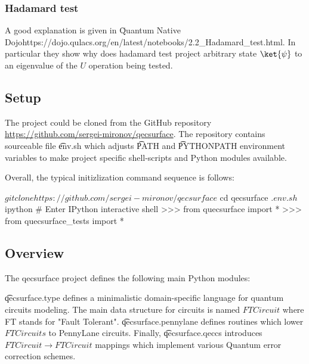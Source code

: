 \subsubsection*{Hadamard test}

A good explanation is given in
\u{Quantum Native Dojo}{https://dojo.qulacs.org/en/latest/notebooks/2.2_Hadamard_test.html}.
In particular they show why does hadamard test project arbitrary state $\ket{\psi}$ to an eigenvalue
of the $U$ operation being tested.

\subsection{Setup}

The project could be cloned from the GitHub repository
\url{https://github.com/sergei-mironov/qecsurface}. The repository contains sourceable file
\t{env.sh} which adjusts \t{PATH} and \t{PYTHONPATH} environment variables to make project specific
shell-scripts and Python modules available.

Overall, the typical initizlization command sequence is follows:

\begin{sh}
$ git clone https://github.com/sergei-mironov/qecsurface
$ cd qecsurface
$ . env.sh
$ ipython # Enter IPython interactive shell
>>> from quecsurface import *
>>> from quecsurface_tests import *
\end{sh}

\subsection{Overview}

The qecsurface project defines the following main Python modules:

\ls \t{qecsurface.type} defines a minimalistic domain-specific language for quantum circuits
    modeling. The main data structure for circuits is named $FTCircuit$ where FT stands for
    "Fault Tolerant".
\li \t{qecsurface.pennylane} defines routines which lower $FTCircuits$ to PennyLane circuits.
\li Finally, \t{qecsurface.qeccs} introduces $FTCircuit \to FTCircuit$ mappings
    which implement various Quantum error correction schemes.
\le


